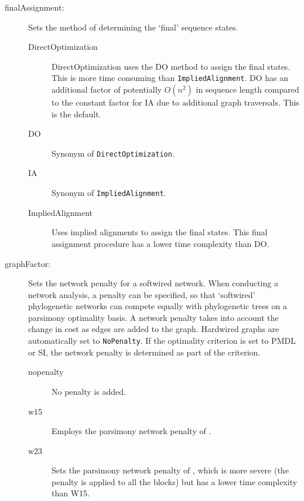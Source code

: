 \begin{description}
		\item[finalAssignment:] Sets the method of determining the `final' sequence states. 
						
		\begin{description}
			
			\item[DirectOptimization] DirectOptimization uses the DO method to assign 
			the final states. This is more time consuming than \texttt{ImpliedAlignment}. 
			DO has an additional factor of potentially $O(n^2)$ in sequence length compared 
			to the constant factor for IA due to additional graph traversals. This is the default.

			\item[DO] Synonym of \texttt{DirectOptimization}.
			
			\item[IA] Synonym of \texttt{ImpliedAlignment}.
			
			\item[ImpliedAlignment] Uses implied alignments to assign the final states. This 
			final assignment procedure has a lower time complexity than DO.
			
		\end{description}
			
		\item[graphFactor:] Sets the network penalty for a softwired network. When conducting 
		a network analysis, a penalty can be specified, so that ‘softwired’ phylogenetic networks 
		can compete equally with phylogenetic trees on a parsimony optimality basis. A network 
		penalty takes into account the change in cost as edges are added to the graph. Hardwired 
		graphs are automatically set to \texttt{NoPenalty}. If the optimality criterion is set to PMDL 
		or SI, the network penalty is determined as part of the criterion.
			
		\begin{description}
			
			\item[nopenalty] No penalty is added.	

			\item[w15] Employs the parsimony network penalty of \cite{Wheeler2015}.	
		
			\item[w23] Sets the parsimony network penalty of \cite{WheelerandWashburn2023}, 
			which is more severe (the penalty is applied to all the blocks) but has a lower time 
			complexity than W15.		

		\end{description}
			

\end{description}
